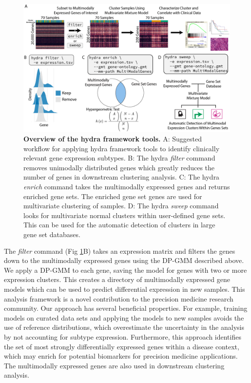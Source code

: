 \documentclass[10pt,letterpaper]{article}
\begin{document}
\begin{figure}[h!]
	\includegraphics[width=\textwidth]{"img/PNG/overview-fig"}
	\caption{{\bf Overview of the hydra framework tools.}
		A: Suggested workflow for applying hydra framework tools to identify clinically relevant gene expression subtypes. B: The hydra \textit{filter} command removes unimodally distributed genes which greatly reduces the number of genes in downstream clustering analysis. C: The hydra \textit{enrich} command takes the multimodally expressed genes and returns enriched gene sets. The enriched gene set genes are used for multivariate clustering of samples. D: The hydra
	    \textit{sweep} command looks for multivariate normal clusters within user-defined gene sets. This can be used for the automatic detection of clusters in large gene set databases.
		\label{overview}}
\end{figure}

The \textit{filter} command (Fig \ref{overview}B) takes an expression matrix and filters the genes down to the multimodally expressed genes using the DP-GMM described above. We apply a DP-GMM to each gene, saving the model for genes with two or more expression clusters. This creates a directory of multimodally expressed gene models which can be used to predict differential expression in new samples. This analysis framework is a novel contribution to the precision medicine research community. Our approach has several beneficial properties. For example, training models on curated data sets and applying the models to new samples avoids the use of reference distributions, which overestimate the uncertainty in the analysis by not accounting for subtype expression. Furthermore, this approach identifies the set of most strongly differentially expressed genes within a disease context, which may enrich for potential biomarkers for precision medicine applications. The multimodally expressed genes are also used in downstream clustering analysis.
\end{document}
